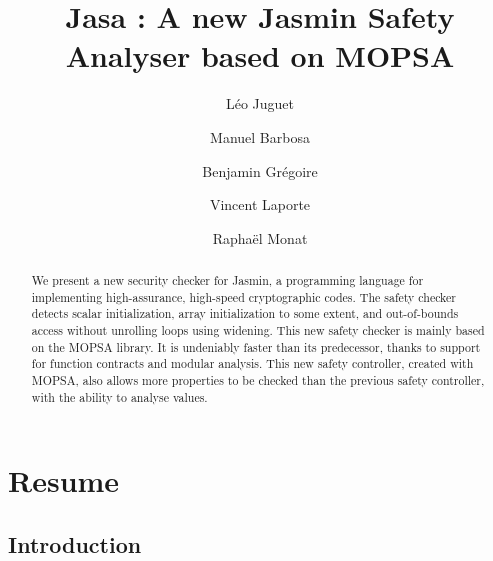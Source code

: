 \documentclass[runningheads]{llncs}
\begin{document}
%
\title{
  Jasa : A new Jasmin Safety Analyser based on MOPSA
}
%
%
\author{Léo Juguet \and
		Manuel Barbosa \and
		Benjamin Grégoire \and
		Vincent Laporte \and
		Raphaël Monat
}
%
%
%
\maketitle              %
%
\begin{abstract}
We present a new security checker for Jasmin, a programming language for 
implementing high-assurance, high-speed cryptographic codes. The safety
checker detects scalar initialization, array initialization to some extent, 
and out-of-bounds access without unrolling loops using widening. This new safety 
checker is mainly based on the MOPSA library. 
It is undeniably faster than its predecessor, 
thanks to support for function contracts and modular analysis. 
This new safety controller, created with MOPSA, also allows more properties 
to be checked than the previous safety controller, with the ability to analyse 
values.

\end{abstract}
%
%
%
\section{Resume}
\subsection{Introduction}
\end{document}
